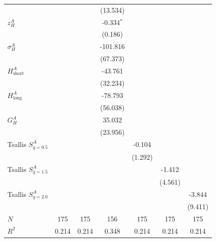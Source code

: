\begin{table}[htbp]
\begin{tabular}{lcccccc}
  &  &  & (13.534) &  &  &  \\[2pt]
  $z^A_H$ &  &  & -0.334$^{*}$ &  &  &  \\
  &  &  & (0.186) &  &  &  \\[2pt]
  $\sigma^A_H$ &  &  & -101.816 &  &  &  \\
  &  &  & (67.373) &  &  &  \\[2pt]
  $H^A_{\mathrm{short}}$ &  &  & -43.761 &  &  &  \\
  &  &  & (32.234) &  &  &  \\[2pt]
  $H^A_{\mathrm{long}}$ &  &  & -78.793 &  &  &  \\
  &  &  & (56.038) &  &  &  \\[2pt]
  $G^A_H$ &  &  & 35.032 &  &  &  \\
  &  &  & (23.956) &  &  &  \\[2pt]
  Tsallis $S^A_{q=0.5}$ &  &  &  & -0.104 &  &  \\
  &  &  &  & (1.292) &  &  \\[2pt]
  Tsallis $S^A_{q=1.5}$ &  &  &  &  & -1.412 &  \\
  &  &  &  &  & (4.561) &  \\[2pt]
  Tsallis $S^A_{q=2.0}$ &  &  &  &  &  & -3.844 \\
  &  &  &  &  &  & (9.411) \\[2pt]
\midrule
  $N$ & 175 & 175 & 156 & 175 & 175 & 175 \\
  $R^2$ & 0.214 & 0.214 & 0.348 & 0.214 & 0.214 & 0.214 \\
\bottomrule
\end{tabular}
\end{table}